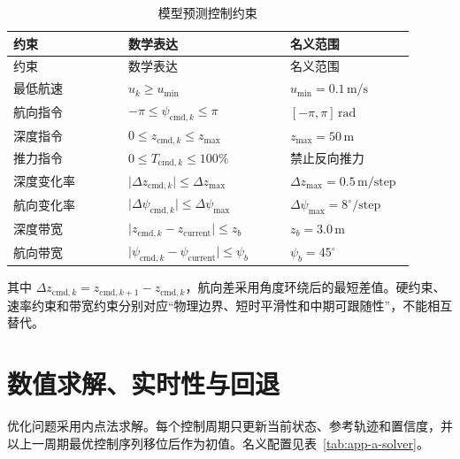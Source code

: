 \begin{longtable}{@{}>{\raggedright\arraybackslash}p{0.27\linewidth}>{\raggedright\arraybackslash}p{0.38\linewidth}>{\raggedright\arraybackslash}p{0.25\linewidth}@{}}
\caption{模型预测控制约束}\label{tab:app-a-hard-constraints}\\
\toprule
约束 & 数学表达 & 名义范围 \\
\midrule
\endfirsthead
\toprule
约束 & 数学表达 & 名义范围 \\
\midrule
\endhead
\bottomrule
\endfoot
最低航速 & \(u_k\ge u_{\min}\) & \(u_{\min}=0.1\,\mathrm{m/s}\) \\
航向指令 & \(-\pi\le\psi_{\mathrm{cmd},k}\le\pi\) & \([-\pi,\pi]\,\mathrm{rad}\) \\
深度指令 & \(0\le z_{\mathrm{cmd},k}\le z_{\max}\) & \(z_{\max}=50\,\mathrm{m}\) \\
推力指令 & \(0\le T_{\mathrm{cmd},k}\le100\%\) & 禁止反向推力 \\
深度变化率 & \(\lvert\Delta z_{\mathrm{cmd},k}\rvert\le\Delta z_{\max}\) & \(\Delta z_{\max}=0.5\,\mathrm{m/step}\) \\
航向变化率 & \(\lvert\Delta\psi_{\mathrm{cmd},k}\rvert\le\Delta\psi_{\max}\) & \(\Delta\psi_{\max}=8^\circ/\mathrm{step}\) \\
深度带宽 & \(\lvert z_{\mathrm{cmd},k}-z_{\mathrm{current}}\rvert\le z_b\) & \(z_b=3.0\,\mathrm{m}\) \\
航向带宽 & \(\lvert\psi_{\mathrm{cmd},k}-\psi_{\mathrm{current}}\rvert\le\psi_b\) & \(\psi_b=45^\circ\) \\
\end{longtable}

其中 \(\Delta z_{\mathrm{cmd},k}=z_{\mathrm{cmd},k+1}-z_{\mathrm{cmd},k}\)，航向差采用角度环绕后的最短差值。硬约束、速率约束和带宽约束分别对应“物理边界、短时平滑性和中期可跟随性”，不能相互替代。

\section{数值求解、实时性与回退}\label{sec:app-a-5}

优化问题采用内点法求解。每个控制周期只更新当前状态、参考轨迹和置信度，并以上一周期最优控制序列移位后作为初值。名义配置见表~\ref{tab:app-a-solver}。

